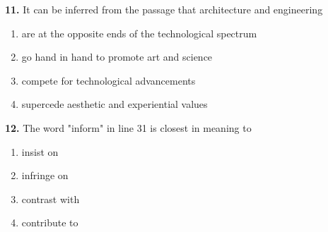 \documentclass[12pt]{article}
\begin{document}
\par
\vspace{0.25\baselineskip}
\noindent\textbf{11.} It can be inferred from the passage that architecture and engineering
\begin{enumerate}[label=(\Alph*),leftmargin=*,itemsep=0.2em]
\item are at the opposite ends of the technological spectrum
\item go hand in hand to promote art and science
\item compete for technological advancements
\item supercede aesthetic and experiential values
\end{enumerate}
\par
\vspace{0.25\baselineskip}
\noindent\textbf{12.} The word "inform" in line 31 is closest in meaning to
\begin{enumerate}[label=(\Alph*),leftmargin=*,itemsep=0.2em]
\item insist on
\item infringe on
\item contrast with
\item contribute to
\end{enumerate}
\par
\vspace{0.25\baselineskip}
\end{document}
